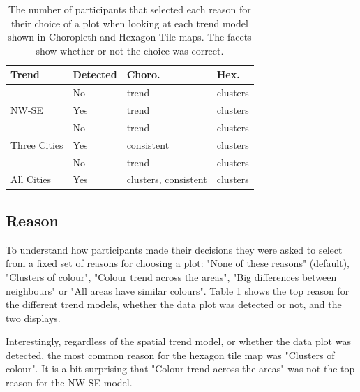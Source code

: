 \documentclass[journal]{vgtc}                     %
\begin{document}
\begin{table}

\caption{\label{tab:reason}The number of participants that selected each reason for their choice of a plot when looking at each trend model shown in Choropleth and Hexagon Tile maps. The facets show whether or not the choice was correct.}
\centering
\begin{tabular}[t]{llll}
\toprule
Trend & Detected & Choro. & Hex.\\
\midrule
 & No & trend & clusters\\
\cmidrule{2-4}
\multirow{-2}{*}{\raggedright NW-SE} & Yes & trend & clusters\\
\cmidrule{1-4}
 & No & trend & clusters\\
\cmidrule{2-4}
\multirow{-2}{*}{\raggedright Three Cities} & Yes & consistent & clusters\\
\cmidrule{1-4}
 & No & trend & clusters\\
\cmidrule{2-4}
\multirow{-2}{*}{\raggedright All Cities} & Yes & clusters, consistent & clusters\\
\bottomrule
\end{tabular}
\end{table}

\hypertarget{reason}{%
\subsection{Reason}\label{reason}}

To understand how participants made their decisions they were asked to select from a fixed set of reasons for choosing a plot: "None of these reasons" (default), "Clusters of colour", "Colour trend across the areas", "Big differences between neighbours" or "All areas have similar colours". Table \ref{tab:reason} shows the top reason for the different trend models, whether the data plot was detected or not, and the two displays. 

Interestingly, regardless of the spatial trend model, or whether the data plot was detected, the most common reason for the hexagon tile map was "Clusters of colour". It is a bit surprising that "Colour trend across the areas" was not the top reason for the NW-SE model.
\end{document}
